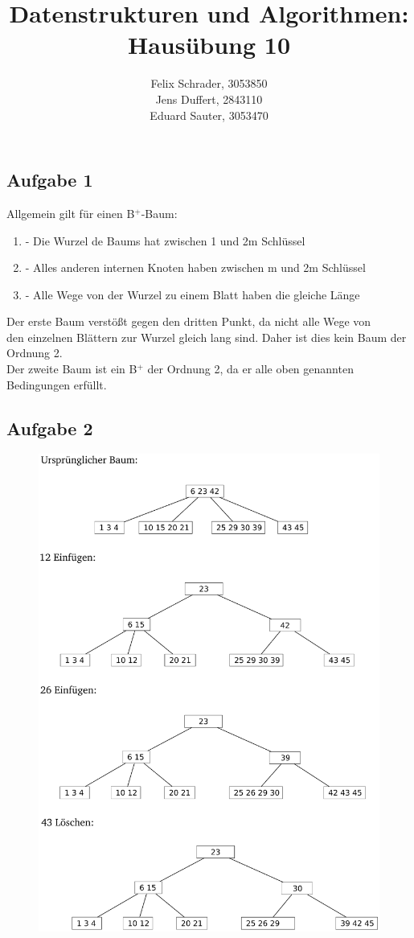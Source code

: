 \documentclass[11pt]{article}
\author{
  Felix Schrader, 3053850 \\ 
  Jens Duffert, 2843110 \\
  Eduard Sauter, 3053470
}
\title{Datenstrukturen und Algorithmen: Haus\"ubung 10}
\begin{document}
\maketitle
\subsection*{Aufgabe 1}
Allgemein gilt für einen B$^{+}$-Baum:\\
\begin{enumerate}
\item
	- Die Wurzel de Baums hat zwischen 1 und 2m Schlüssel
\item
	- Alles anderen internen Knoten haben zwischen m und 2m Schlüssel
\item
	- Alle Wege von der Wurzel zu einem Blatt haben die gleiche Länge
\end{enumerate}
	
Der erste Baum verstößt gegen den dritten Punkt, da nicht alle Wege von\\
den einzelnen Blättern zur Wurzel gleich lang sind. Daher ist dies kein Baum
der Ordnung 2.\\
Der zweite Baum ist ein B$^{+}$ der Ordnung 2, da er alle oben genannten 
Bedingungen erfüllt.

\subsection*{Aufgabe 2}
\begin{figure}[h!]
  \centering
  \includegraphics[width=\textwidth]{b+tree_insert_delete}
  \label{fig:tree_insert_delete}
\end{figure}
\end{document}

